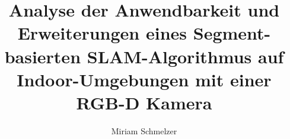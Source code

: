 \documentclass[]{htwg-report}
\begin{document}
\renewcommand{\figurename}{Abbildung}
\renewcommand{\tablename}{Tabelle}
\renewcommand{\contentsname}{Inhaltsverzeichnis}
\renewcommand{\listfigurename}{Abbildungsverzeichnis}
\renewcommand{\listtablename}{Tabellenverzeichnis}

\frontmatter


\title[Analyse der Anwendbarkeit und Erweiterungen eines Segment-basierten SLAM-Algorithmus auf Indoor-Umgebungen mit einer RGB-D Kamera]{Analyse der Anwendbarkeit und Erweiterungen eines Segment-basierten SLAM-Algorithmus auf Indoor-Umgebungen mit einer RGB-D Kamera}

\author{Miriam Schmelzer}
\newcommand{\verfasserA}{Miriam Schmelzer}
\newcommand{\verfasserB}{Florian Kopp}
\newcommand{\thema}{Analyse der Anwendbarkeit und Erweiterungen eines Segment-basierten SLAM-Algorithmus auf Indoor-Umgebungen mit einer RGB-D Kamera}
\newcommand{\dobA}{16.08.1994}
\newcommand{\birthplaceA}{Bochum}
\newcommand{\dobB}{22.04.1990}
\newcommand{\birthplaceB}{Böblingen}
\newcommand{\hoschschule}{Hochschule Konstanz (HTWG)}
\newcommand{\institut}{HTWG Konstanz, Labor für mobile Robotik}
\newcommand{\prueferA}{Prof. Dr. Oliver Bittel}
\newcommand{\prueferB}{Dipl.-Inf.-Wiss. Jürgen Keppler}
\newcommand{\ausgabedatum}{01.09.2019}
\newcommand{\abgabedatum}{29.05.2020}
\newcommand{\type}{Master}
\newcommand{\typeshortcut}{M}
\newcommand{\studiengangA}{Master Informatik}
\newcommand{\studiengangB}{Elektrische Systeme}
\newcommand{\strasseA}{Muntpratstr. 9}
\newcommand{\wohnortA}{78462 Konstanz}
\newcommand{\strasseB}{Josef-Haydn-Weg 6}
\newcommand{\wohnortB}{71032 Böblingen}
\newcommand{\schlagworte}{ROS, Segmentierung, SLAM, RGB-D Kamera}

%          




%



\tableofcontents

\listoffigures

\listoftables

\end{document}

